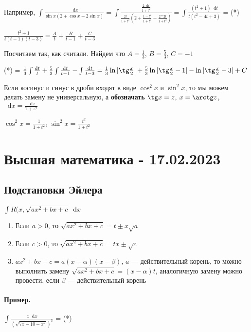 \documentclass{article}
\newcommand*\diff{\mathop{}\!\mathrm{d}}
\begin{document}
\hfill

Например, $\int \frac{\diff x}{\sin x (2 + \cos x - 2 \sin x)} = \int \frac{\frac{2 \diff t}{1 + t^2}}{\frac{2t}{1 + t^2} (2 + \frac{1 - t^2}{1 + t^2} - \frac{2 * 2 t}{1 + t^2})} = \int \frac{(t^2 + 1) \diff t}{t (t^2 - 4t + 3)}$ = (*)

$\frac{t^2 + 1}{t(t - 1)(t - 3)} = \frac{A}{t} + \frac{B}{t - 1} + \frac{C}{t - 3}$

Посчитаем так, как считали. Найдем что $A = \frac{1}{3}$, $B = \frac{5}{3}$, $C = -1$

(*) = $\frac{1}{3} \int \frac{\diff t}{t} + \frac{5}{3} \int \frac{\diff t}{t - 1} - \int \frac{\diff t}{t - 3} = \frac{1}{3} \ln |\tg \frac{x}{2}| + \frac{5}{3} \ln |\tg \frac{x}{2} - 1| - \ln |\tg \frac{x}{2} - 3| + C$

\hfill

Если косинус и синус в дроби входят в виде $\cos^2 x$ и $\sin^2 x$, то мы можем делать замену не универсальную, а \textbf{обозначать} $\tg x = z$, $x = \arctg z$, $\diff x = \frac{\diff z}{1 + z^2}$

$\cos^2 x = \frac{1}{1 + t^2}$, $\sin^2 x = \frac{t^2}{1 + t^2}$

\pagebreak
\section{Высшая математика - 17.02.2023}

\subsection{Подстановки Эйлера}

$\int R (x, \sqrt{ax^2 + bx + c} \diff x$

\begin{enumerate}
    \item Если $a > 0$, то $\sqrt{a x^2 + bx + c} = t \pm x \sqrt{a}$
    \item Если $c > 0$, то $\sqrt{a x^2 + bx + c} = t x \pm \sqrt{c}$
    \item $a x^2 + b x + c = a (x - \alpha) (x - \beta)$, $a$ — действительный корень, то можно выполнить замену $\sqrt{a x^2 + b x + c} = (x - \alpha) t$, аналогичную замену можно провести, если $\beta$ — действительный корень
\end{enumerate}

\paragraph{Пример. } $\int \frac{x \diff x}{(\sqrt{7x - 10 - x^2})^3}$ = (*)
\end{document}
